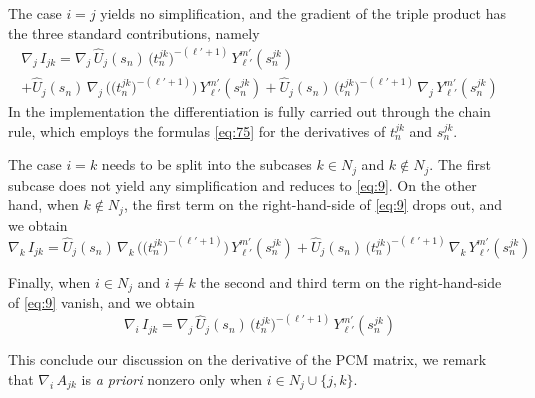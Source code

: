 \documentclass[aip,jcp,a4paper,11pt]{revtex4-1}
\newcommand{\nablai}{\nabla_{\!i}\,}
\newcommand{\nablaj}{\nabla_{\!j}\,}
\newcommand{\nablak}{\nabla_{\!k}\,}
\newcommand{\Dj}{D_j}
\begin{document}
The case $i = j$ yields no simplification, and the gradient of the triple product has the three standard contributions, namely
\begin{multline}\label{eq:9}
\nablaj I_{jk}= \nablaj \hat{U}_j(s_n)  \,  \big( t_n^{jk}\big)^{-(\ell'+1)} \, Y_{\ell'}^{m'} (s_n^{jk}) \\
+ \hat{U}_j(s_n)  \, \nablaj \Big(  \big( t_n^{jk}\big)^{-(\ell'+1)} \Big) \, Y_{\ell'}^{m'} (s_n^{jk}) +  \hat{U}_j(s_n)  \,  \big( t_n^{jk}\big)^{-(\ell'+1)} \, \nablaj Y_{\ell'}^{m'} (s_n^{jk})
\end{multline}
In the implementation the differentiation is fully carried out through the chain rule, which employs the formulas \eqref{eq:75} for the derivatives of $t_n^{jk}$ and $s_n^{jk}$.

The case $i =k$ needs to be split into the subcases $k \in N_j$ and $k \not \in N_j$. The first subcase does not yield any simplification and reduces to \eqref{eq:9}. On the other hand, when $k \not\in N_j$, the first term on the right-hand-side of \eqref{eq:9} drops out, and we obtain
\[
\nablak I_{jk} = 
 \hat{U}_j(s_n)  \, \nablak \Big(  \big( t_n^{jk}\big)^{-(\ell'+1)} \Big) \, Y_{\ell'}^{m'} (s_n^{jk}) +  \hat{U}_j(s_n)  \,  \big( t_n^{jk}\big)^{-(\ell'+1)} \, \nablak Y_{\ell'}^{m'} (s_n^{jk})
\]

Finally, when $i \in N_j$ and $i \not=k$ the second and third term on the right-hand-side of \eqref{eq:9} vanish, and we obtain 
\[
\nablai I_{jk} = \nablaj \hat{U}_j(s_n)  \,  \big( t_n^{jk}\big)^{-(\ell'+1)} \, Y_{\ell'}^{m'} (s_n^{jk})
\]

This conclude our discussion on the derivative of the PCM matrix, we remark that $\nablai A_{jk}$ is \emph{a priori} nonzero only when $i \in N_j \cup \{ j,k\}$.
\end{document}
